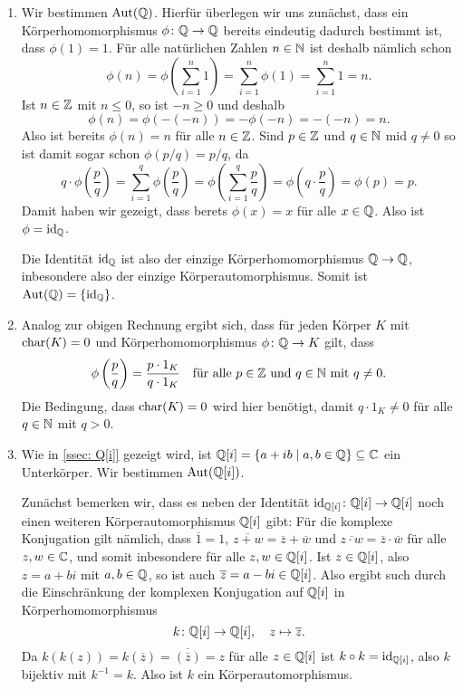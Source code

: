 \begin{bsp}
 \begin{enumerate}[leftmargin=*]
  \item
   Wir bestimmen $\mathrm{Aut}(\mathbb{Q})$. Hierfür überlegen wir uns zunächst, dass ein Körperhomomorphismus $\phi \colon \mathbb{Q} \to \mathbb{Q}$ bereits eindeutig dadurch bestimmt ist, dass $\phi(1) = 1$. Für alle natürlichen Zahlen $n \in \mathbb{N}$ ist deshalb nämlich schon
   \[
    \phi(n)
    = \phi\left( \sum_{i=1}^n 1 \right)
    = \sum_{i=1}^n \phi(1)
    = \sum_{i=1}^n 1
    = n.
   \]
   Ist $n \in \mathbb{Z}$ mit $n \leq 0$, so ist $-n \geq 0$ und deshalb
   \[
    \phi(n)
    = \phi(-(-n))
    = -\phi(-n)
    = -(-n)
    = n.
   \]
   Also ist bereits $\phi(n) = n$ für alle $n \in \mathbb{Z}$. Sind $p \in \mathbb{Z}$ und $q \in \mathbb{N}$ mid $q \neq 0$ so ist damit sogar schon $\phi(p/q) = p/q$, da
   \[
    q \cdot \phi\left( \frac{p}{q} \right)
    = \sum_{i=1}^q \phi\left( \frac{p}{q} \right)
    = \phi\left( \sum_{i=1}^q \frac{p}{q} \right)
    = \phi\left(q \cdot \frac{p}{q}\right)
    = \phi(p)
    = p.
   \]
   Damit haben wir gezeigt, dass berets $\phi(x) = x$ für alle $x \in \mathbb{Q}$. Also ist $\phi = \mathrm{id}_{\mathbb{Q}}$.
   
   Die Identität $\mathrm{id}_{\mathbb{Q}}$ ist also der einzige Körperhomomorphismus $\mathbb{Q} \to \mathbb{Q}$, inbesondere also der einzige Körperautomorphismus. Somit ist $\mathrm{Aut}(\mathbb{Q}) = \{\mathrm{id}_{\mathbb{Q}}\}$.
  \item
   Analog zur obigen Rechnung ergibt sich, dass für jeden Körper $K$ mit $\mathrm{char}(K) = 0$ und Körperhomomorphismus $\phi \colon \mathbb{Q} \to K$ gilt, dass
   \[
    \phi\left(\frac{p}{q}\right) = \frac{p \cdot 1_K}{q \cdot 1_K}
    \quad
    \text{für alle $p \in \mathbb{Z}$ und $q \in \mathbb{N}$ mit $q \neq 0$}.
   \]
   Die Bedingung, dass $\mathrm{char}(K) = 0$ wird hier benötigt, damit $q \cdot 1_K \neq 0$ für alle $q \in \mathbb{N}$ mit $q > 0$.
  \item
   Wie in \ref{ssec: Q[i]} gezeigt wird, ist $\mathbb{Q}[i] = \{a+ib \mid a,b \in \mathbb{Q}\} \subseteq \mathbb{C}$ ein Unterkörper. Wir bestimmen $\mathrm{Aut}(\mathbb{Q}[i])$.
   
   Zunächst bemerken wir, dass es neben der Identität $\mathrm{id}_{\mathbb{Q}[i]} \colon \mathbb{Q}[i] \to \mathbb{Q}[i]$ noch einen weiteren Körperautomorphismus $\mathbb{Q}[i]$ gibt: Für die komplexe Konjugation gilt nämlich, dass $\overline{1} = 1$, $\overline{z+w} = \overline{z}+\overline{w}$ und $\overline{z \cdot w} = \overline{z} \cdot \overline{w}$ für alle $z,w \in \mathbb{C}$, und somit inbesondere für alle $z,w \in \mathbb{Q}[i]$. Ist $z \in \mathbb{Q}[i]$, also $z = a+bi$ mit $a,b \in \mathbb{Q}$, so ist auch $\overline{z} = a-bi \in \mathbb{Q}[i]$. Also ergibt such durch die Einschränkung der komplexen Konjugation auf $\mathbb{Q}[i]$ in Körperhomomorphismus
   \[
    k \colon \mathbb{Q}[i] \to \mathbb{Q}[i], \quad z \mapsto \overline{z}.
   \]
   Da $k(k(z)) = k(\overline{z}) = \overline{(\overline{z})} = z$ für alle $z \in \mathbb{Q}[i]$ ist $k \circ k = \mathrm{id}_{\mathbb{Q}[i]}$, also $k$ bijektiv mit $k^{-1} = k$. Also ist $k$ ein Körperautomorphismus.
   

\end{enumerate}
\end{bsp}

